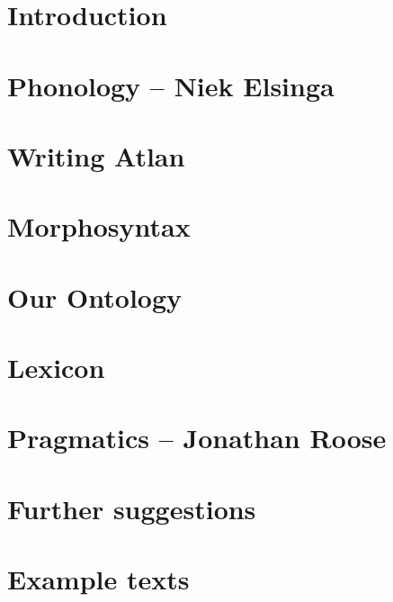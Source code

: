 \documentclass[twoside, openany, 12pt, a5paper]{book}
\begin{document}
\frontmatter






\mainmatter

\chapter{Introduction}

\chapter{Phonology -- {\small Niek Elsinga}}

\chapter{Writing Atlan}

\chapter{Morphosyntax}

\chapter{Our Ontology}

\chapter{Lexicon}


\chapter{Pragmatics -- {\small Jonathan Roose}}

\chapter{Further suggestions}

\chapter{Example texts}
\end{document}

